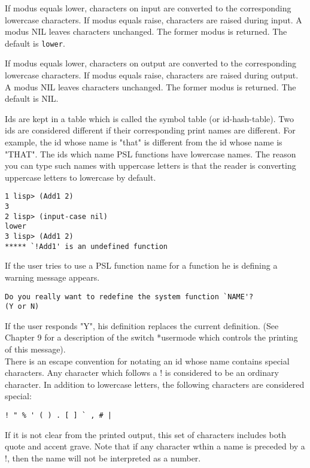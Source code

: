 {    If modus equals lower, characters on input are converted to the
corresponding lowercase characters. If modus equals raise, characters
are raised during input. A modus NIL leaves characters unchanged.
The former modus is returned. The default is {\tt lower}.
}

{    If modus equals lower, characters on output are converted to the
corresponding lowercase characters. If modus equals raise, characters
are raised during output. A modus NIL leaves characters unchanged.
The former modus is returned. The default is NIL.
}


Ids are kept in a table  which  is  called  the
symbol table (or id-hash-table).  Two ids are considered
different if their corresponding print names are different.  For
example, the id whose name is "that" is different  from  the  id
whose  name is "THAT". The ids which name PSL functions have
lowercase names. The reason you can type such names with
uppercase letters  is  that  the reader is converting
uppercase letters to lowercase by default.

\begin{verbatim}
1 lisp> (Add1 2)
3
2 lisp> (input-case nil)
lower
3 lisp> (Add1 2)
***** `!Add1' is an undefined function
\end{verbatim}
\noindent  
If the user tries to use a PSL function name for a function he
is defining a warning message appears.

\begin{verbatim}
Do you really want to redefine the system function `NAME'? 
(Y or N)
\end{verbatim}

\noindent
If the user responds "Y", his definition  replaces  the  current
definition.    (See  Chapter  9  for a description of the switch
*usermode which controls the printing of this message).\\

\noindent
There is an escape convention for notating an  id  whose  name
contains special characters.  Any character which follows a ! is
considered  to  be  an  ordinary  character.    In  addition  to
lowercase  letters,  the  following  characters  are  considered
special:
\begin{verbatim}
! " % ' ( ) . [ ] ` , # |
\end{verbatim}
If  it  is  not  clear  from  the  printed  output,  this set of
characters includes both quote and accent grave.  Note  that  if
any  character  wthin  a  name is preceded by a !, then the name
will not be interpreted as a number.\\

